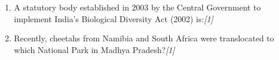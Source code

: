\documentclass[11pt,a4paper]{article}
\newcommand{\pts}[1]{\hfill \textit{[#1]}}
\begin{document}
\begin{enumerate}[label=\textbf{\arabic*.},leftmargin=*,itemsep=8pt]
  \item A statutory body established in 2003 by the Central Government to implement India's Biological Diversity Act (2002) is:\pts{1}

  \item Recently, cheetahs from Namibia and South Africa were translocated to which National Park in Madhya Pradesh?\pts{1}

\end{enumerate}
\end{document}
